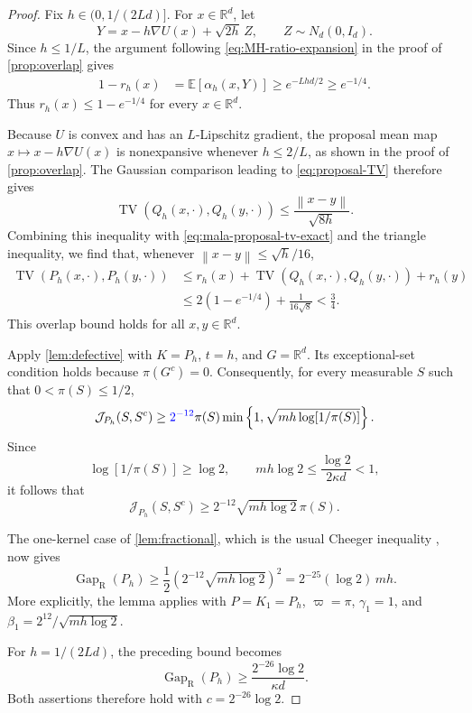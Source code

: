 \documentclass[11pt]{article}
\newcommand{\pRevision}[1]{{\color{blue}#1}}
\newcommand{\R}{\mathbb R}
\newcommand{\E}{\mathbb E}
\newcommand{\Gap}{\operatorname{Gap}_{\mathrm{R}}}
\newcommand{\TV}{\operatorname{TV}}
\newcommand{\norm}[1]{\left\lVert #1\right\rVert}
\newcommand{\1}{\mathbf 1}
\begin{document}
	\begin{proof}
		Fix \(h\in(0,1/(2Ld)]\). For \(x\in\R^d\), let
		\[
		Y=x-h\nabla U(x)+\sqrt{2h}\,Z,
		\qquad Z\sim N_d(0,I_d).
		\]
		Since \(h\leq1/L\), the argument following
		\eqref{eq:MH-ratio-expansion} in the proof of
		\cref{prop:overlap} gives
		\[
		\begin{aligned}
			1-r_h(x)
			&=\E[\alpha_h(x,Y)]\geq e^{-Lhd/2}
			\geq e^{-1/4}.
		\end{aligned}
		\]
		Thus \(r_h(x)\leq1-e^{-1/4}\) for every \(x\in\R^d\).
		
		Because \(U\) is convex and has an \(L\)-Lipschitz gradient,
		the proposal mean map \(x\mapsto x-h\nabla U(x)\) is
		nonexpansive whenever \(h\leq2/L\), as shown in the proof of
		\cref{prop:overlap}. The Gaussian comparison leading to
		\eqref{eq:proposal-TV} therefore gives
		\[
		\TV(Q_h(x,\cdot),Q_h(y,\cdot))
		\leq\frac{\norm{x-y}}{\sqrt{8h}}.
		\]
		Combining this inequality with
		\eqref{eq:mala-proposal-tv-exact} and the triangle inequality,
		we find that, whenever \(\norm{x-y}\leq\sqrt h/16\),
		\[
		\begin{aligned}
			\TV(P_h(x,\cdot),P_h(y,\cdot))
			&\leq r_h(x)
			+\TV(Q_h(x,\cdot),Q_h(y,\cdot))
			+r_h(y)\\
			&\leq2(1-e^{-1/4})+\frac{1}{16\sqrt8}
			<\frac34.
		\end{aligned}
		\]
		This overlap bound holds for all \(x,y\in\R^d\).
		
		Apply \cref{lem:defective} with \(K=P_h\), \(t=h\),
		and \(G=\R^d\). Its exceptional-set condition holds because
		\(\pi(G^c)=0\). Consequently, for every measurable \(S\)
		such that \(0<\pi(S)\leq1/2\),
		\[
		\mathcal{J}_{P_h}(S,S^c)
		\geq
		\pRevision{2^{-12}}\pi(S)
		\min\left\{1,\sqrt{mh\log[1/\pi(S)]}\right\}.
		\]
		Since
		\[
		\log[1/\pi(S)]\geq\log2,
		\qquad
		mh\log2\leq\frac{\log2}{2\kappa d}<1,
		\]
		it follows that
		\[
		\mathcal{J}_{P_h}(S,S^c)
		\geq
		 2^{-12} \sqrt{mh\log2}\,\pi(S).
		\]
		
		The one-kernel case of \cref{lem:fractional}, which is the
		usual Cheeger inequality \citep{LawlerSokal1988}, now gives
		\[
		\Gap(P_h)
		\geq
		\frac12\left( 2^{-12} \sqrt{mh\log2}\right)^2
		=
		 2^{-25} (\log2)\,mh.
		\]
		More explicitly, the lemma applies with
		\(P=K_1=P_h\), \(\varpi=\pi\), \(\gamma_1=1\), and
		\(\beta_1= 2^{12} /\sqrt{mh\log2}\).
		
		For \(h=1/(2Ld)\), the preceding bound becomes
		\[
		\Gap(P_h)
		\geq
		\frac{ 2^{-26} \log2}{\kappa d}.
		\]
		Both assertions therefore hold with
		\(c= 2^{-26} \log2\).
	\end{proof}
	
	
	
	
	
	
	
	
	
	
\end{document}
